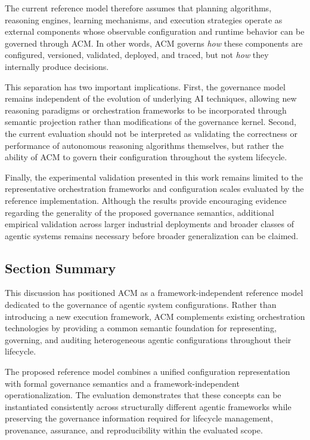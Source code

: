 \documentclass[10pt]{article}
\begin{document}
The current reference model therefore assumes that planning algorithms,
reasoning engines, learning mechanisms, and execution strategies operate as
external components whose observable configuration and runtime behavior can be
governed through ACM. In other words, ACM governs \emph{how} these components
are configured, versioned, validated, deployed, and traced, but not
\emph{how} they internally produce decisions.

This separation has two important implications. First, the governance model
remains independent of the evolution of underlying AI techniques, allowing new
reasoning paradigms or orchestration frameworks to be incorporated through
semantic projection rather than modifications of the governance kernel.
Second, the current evaluation should not be interpreted as validating the
correctness or performance of autonomous reasoning algorithms themselves, but
rather the ability of ACM to govern their configuration throughout the system
lifecycle.

Finally, the experimental validation presented in this work remains limited to
the representative orchestration frameworks and configuration scales evaluated
by the reference implementation. Although the results provide encouraging
evidence regarding the generality of the proposed governance semantics,
additional empirical validation across larger industrial deployments and
broader classes of agentic systems remains necessary before broader
generalization can be claimed.

\subsection{Section Summary}

This discussion has positioned ACM as a framework-independent reference model dedicated to the governance of agentic system configurations. Rather than introducing a new execution framework, ACM complements existing orchestration technologies by providing a common semantic foundation for representing, governing, and auditing heterogeneous agentic configurations throughout their lifecycle.

The proposed reference model combines a unified configuration representation with formal governance semantics and a framework-independent operationalization. The evaluation demonstrates that these concepts can be instantiated consistently across structurally different agentic frameworks while preserving the governance information required for lifecycle management, provenance, assurance, and reproducibility within the evaluated scope.
\end{document}
